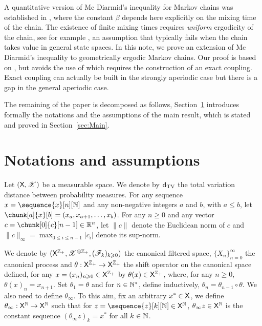 \documentclass[leqno,11pt,a4paper]{article}
\begin{document}
A quantitative version of Mc Diarmid's inequality for Markov chains was established in \cite{paulin:2015}, where the constant $\beta$ depends here explicitly on the mixing time of the chain.
The existence of finite mixing times requires \emph{uniform} ergodicity of the chain, see for example \cite[Section 3.3]{MR2095565}, an  assumption that typically fails when the chain takes value in general state spaces.
In this note, we prove an extension of Mc Diarmid's inequality to geometrically ergodic Markov chains.
Our proof is based on  \cite{MR3407208},
but avoids the use of \cite[Lemma~6]{MR3407208} which requires the construction of an exact coupling.
Exact coupling can actually be built in the strongly aperiodic case but there is a gap in the general aperiodic case.

The remaining of the paper is decomposed as follows, Section~\ref{sec:Setting} introduces formally the notations and the assumptions of the main result, which is stated and proved in Section~\ref{sec:Main}.


\section{Notations and assumptions}\label{sec:Setting}
Let $(\mathsf{X},\mathscr{X})$ be a measurable space.
We denote by $\mathrm{d}_{\mathrm{TV}}$  the total variation distance between probability measures.
For any sequence $x=\sequence{x}[n][\Nbb]$ and any non-negative integers $a$ and $b$, with $a\leqslant b$, let $\chunk[a]{x}[b]=(x_a,x_{a+1},\ldots,x_b)$.
For any $n\geqslant 0$ and any vector $c=\chunk[0]{c}[n-1]\in \R^n$, let $\|c\|$ denote the Euclidean norm of $c$ and $\|c\|_\infty=\max_{0\leqslant i\leqslant n-1}|c_i|$ denote its sup-norm.


We denote by $(\mathsf{X}^{\mathbb{Z}_+},\mathscr{X}^{\otimes\mathbb{Z}_+}, (\mathscr{F}_k)_{k\geqslant 0})$ the canonical filtered space,
$\{X_n\}_{n=0}^\infty$ the canonical process and $\theta: \mathsf{X}^{\mathbb{Z}_+}\to\mathsf{X}^{\mathbb{Z}_+}$  the shift operator on the canonical space defined, for any $x=(x_{n})_{n\geqslant 0}\in \mathsf{X}^{\mathbb{Z}_+}$ by $\theta(x)\in \mathsf{X}^{\mathbb{Z}_+}$, where, for any $n\geqslant 0$, $\theta(x)_n=x_{n+1}$.
Set $\theta_1=\theta$ and for $n\in \mathbb{N}^*$, define inductively, $\theta_n=\theta_{n-1} \circ \theta$. We also need to define $\theta_\infty$. To this aim, fix an arbitrary $x^*\in \mathsf{X}$, we define $\theta_\infty:\mathsf{X}^{\mathbb{N}} \to \mathsf{X}^{\mathbb{N}}$ such that for $z=\sequence{z}[k][\Nbb] \in \Xset^\Nbb$, $\theta_\infty z\in \mathsf{X}^{\mathbb{N}}$ is the constant sequence  $(\theta_\infty z)_k=x^*$ for all $k \in \mathbb{N}$.
\end{document}
